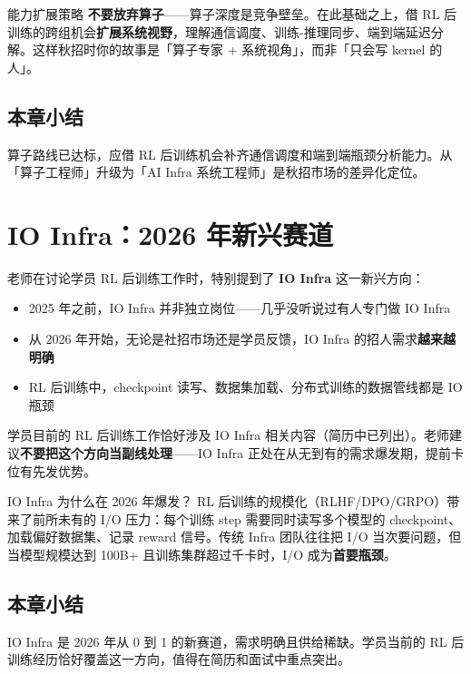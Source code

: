 \documentclass[a4paper]{article}
\begin{document}
\begin{importantbox}{能力扩展策略}
\textbf{不要放弃算子}——算子深度是竞争壁垒。在此基础之上，借 RL 后训练的跨组机会\textbf{扩展系统视野}，理解通信调度、训练-推理同步、端到端延迟分解。这样秋招时你的故事是「算子专家 + 系统视角」，而非「只会写 kernel 的人」。
\end{importantbox}

\subsection{本章小结}
算子路线已达标，应借 RL 后训练机会补齐通信调度和端到端瓶颈分析能力。从「算子工程师」升级为「AI Infra 系统工程师」是秋招市场的差异化定位。

\section{IO Infra：2026 年新兴赛道}

老师在讨论学员 RL 后训练工作时，特别提到了 \textbf{IO Infra} 这一新兴方向：

\begin{itemize}
\item 2025 年之前，IO Infra 并非独立岗位——几乎没听说过有人专门做 IO Infra
\item 从 2026 年开始，无论是社招市场还是学员反馈，IO Infra 的招人需求\textbf{越来越明确}
\item RL 后训练中，checkpoint 读写、数据集加载、分布式训练的数据管线都是 IO 瓶颈
\end{itemize}

学员目前的 RL 后训练工作恰好涉及 IO Infra 相关内容（简历中已列出）。老师建议\textbf{不要把这个方向当副线处理}——IO Infra 正处在从无到有的需求爆发期，提前卡位有先发优势。

\begin{knowledgebox}{IO Infra 为什么在 2026 年爆发？}
RL 后训练的规模化（RLHF/DPO/GRPO）带来了前所未有的 I/O 压力：每个训练 step 需要同时读写多个模型的 checkpoint、加载偏好数据集、记录 reward 信号。传统 Infra 团队往往把 I/O 当次要问题，但当模型规模达到 100B+ 且训练集群超过千卡时，I/O 成为\textbf{首要瓶颈}。
\end{knowledgebox}

\subsection{本章小结}
IO Infra 是 2026 年从 0 到 1 的新赛道，需求明确且供给稀缺。学员当前的 RL 后训练经历恰好覆盖这一方向，值得在简历和面试中重点突出。
\end{document}
